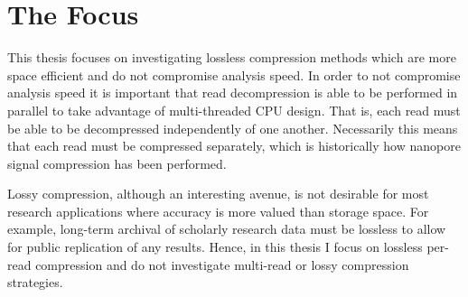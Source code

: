 \section{The Focus}


This thesis focuses on investigating lossless compression methods which are more space efficient and do not compromise analysis speed.
In order to not compromise analysis speed it is important that read decompression is able to be performed in parallel to take advantage of multi-threaded CPU design. That is, each read must be able to be decompressed independently of one another.
Necessarily this means that each read must be compressed separately, which is historically how nanopore signal compression has been performed.


Lossy compression, although an interesting avenue, is not desirable for most research applications where accuracy is more valued than storage space. For example, long-term archival of scholarly research data must be lossless to allow for public replication of any results.
Hence, in this thesis I focus on lossless per-read compression and do not investigate multi-read or lossy compression strategies.
